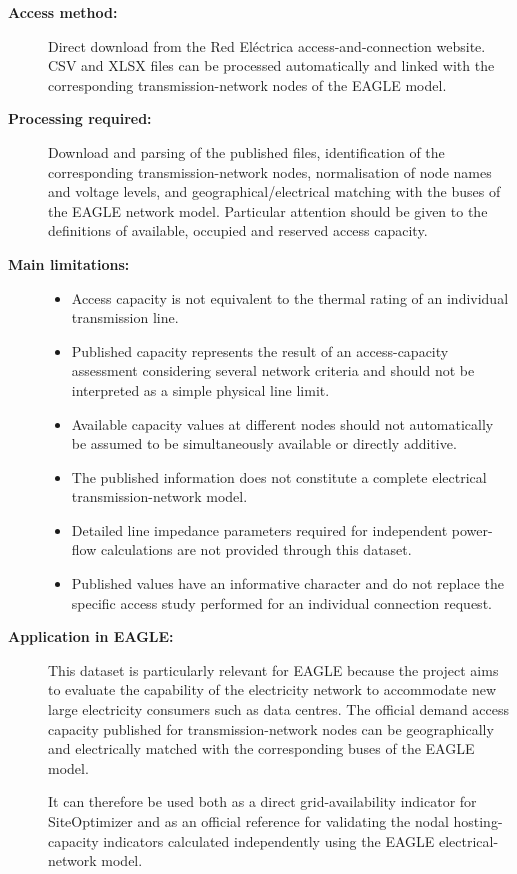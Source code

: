\begin{description}
    \item[\textbf{Access method:}]
    Direct download from the Red Eléctrica access-and-connection website.
    CSV and XLSX files can be processed automatically and linked with the
    corresponding transmission-network nodes of the EAGLE model.

    \item[\textbf{Processing required:}]
    Download and parsing of the published files, identification of the
    corresponding transmission-network nodes, normalisation of node names
    and voltage levels, and geographical/electrical matching with the buses
    of the EAGLE network model. Particular attention should be given to the
    definitions of available, occupied and reserved access capacity.

    \item[\textbf{Main limitations:}] \hfill
    \begin{itemize}
        \item Access capacity is not equivalent to the thermal rating of
        an individual transmission line.

        \item Published capacity represents the result of an access-capacity
        assessment considering several network criteria and should not be
        interpreted as a simple physical line limit.

        \item Available capacity values at different nodes should not
        automatically be assumed to be simultaneously available or directly
        additive.

        \item The published information does not constitute a complete
        electrical transmission-network model.

        \item Detailed line impedance parameters required for independent
        power-flow calculations are not provided through this dataset.

        \item Published values have an informative character and do not
        replace the specific access study performed for an individual
        connection request.
    \end{itemize}

    \item[\textbf{Application in EAGLE:}]
    This dataset is particularly relevant for EAGLE because the project
    aims to evaluate the capability of the electricity network to accommodate
    new large electricity consumers such as data centres. The official
    demand access capacity published for transmission-network nodes can be
    geographically and electrically matched with the corresponding buses
    of the EAGLE model.

    It can therefore be used both as a direct grid-availability indicator
    for SiteOptimizer and as an official reference for validating the nodal
    hosting-capacity indicators calculated independently using the EAGLE
    electrical-network model.

\end{description}


